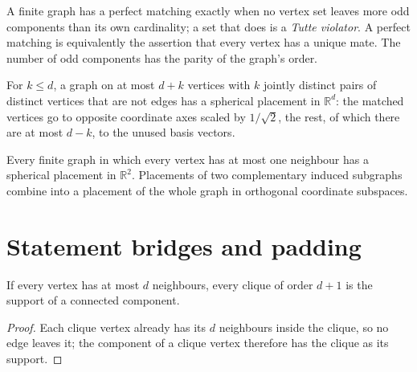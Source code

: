 \begin{theorem}
  \label{lib:tutte}
  \leanok
  A finite graph has a perfect matching exactly when no vertex set leaves more odd
  components than its own cardinality; a set that does is a \emph{Tutte violator}. A
  perfect matching is equivalently the assertion that every vertex has a unique mate. The
  number of odd components has the parity of the graph's order.
\end{theorem}

\begin{lemma}
  \label{lib:cross}
  \leanok
  For $k \le d$, a graph on at most $d + k$ vertices with $k$ jointly distinct pairs of
  distinct vertices that are not edges has a spherical placement in $\mathbb{R}^d$: the
  matched vertices go to opposite coordinate axes scaled by $1/\sqrt2$, the rest, of which
  there are at most $d - k$, to the unused basis vectors.
\end{lemma}

\begin{lemma}
  \label{lib:circles}
  \leanok
  Every finite graph in which every vertex has at most one neighbour has a spherical
  placement in $\mathbb{R}^2$. Placements of two complementary induced subgraphs combine
  into a placement of the whole graph in orthogonal coordinate subspaces.
\end{lemma}

\section{Statement bridges and padding}

\begin{lemma}
  \label{lem:saturated-clique}
  \leanok
  If every vertex has at most $d$ neighbours, every clique of order $d + 1$ is the support
  of a connected component.
\end{lemma}
\begin{proof}
  Each clique vertex already has its $d$ neighbours inside the clique, so no edge leaves
  it; the component of a clique vertex therefore has the clique as its support.
\end{proof}

